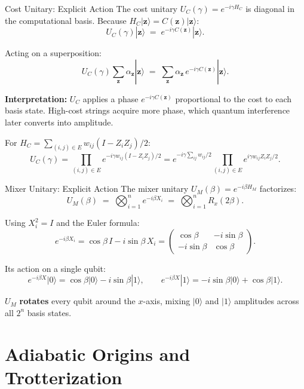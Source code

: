 \documentclass{beamer}
\begin{document}
\begin{frame}{Cost Unitary: Explicit Action}
The cost unitary $U_C(\gamma) = e^{-i\gamma H_C}$ is diagonal in the
computational basis. Because $H_C|\mathbf{z}\rangle = C(\mathbf{z})|\mathbf{z}\rangle$:
\[
U_C(\gamma)|\mathbf{z}\rangle
\;=\; e^{-i\gamma C(\mathbf{z})}|\mathbf{z}\rangle.
\]

Acting on a superposition:
\[
U_C(\gamma)\sum_{\mathbf{z}}\alpha_{\mathbf{z}}|\mathbf{z}\rangle
\;=\; \sum_{\mathbf{z}}\alpha_{\mathbf{z}}\,e^{-i\gamma C(\mathbf{z})}|\mathbf{z}\rangle.
\]

\textbf{Interpretation:} $U_C$ applies a phase $e^{-i\gamma C(\mathbf{z})}$
proportional to the cost to each basis state. High-cost strings
acquire more phase, which quantum interference later converts into
amplitude.

\medskip

For $H_C = \sum_{(i,j)\in E}w_{ij}(I-Z_iZ_j)/2$:
\[
U_C(\gamma) = \prod_{(i,j)\in E}
e^{-i\gamma w_{ij}(I-Z_iZ_j)/2}
= e^{-i\gamma \sum_{ij}w_{ij}/2}
\prod_{(i,j)\in E}e^{i\gamma w_{ij}Z_iZ_j/2}.
\]
\end{frame}


\begin{frame}{Mixer Unitary: Explicit Action}
The mixer unitary $U_M(\beta) = e^{-i\beta H_M}$ factorizes:
\[
U_M(\beta)
\;=\; \bigotimes_{i=1}^n e^{-i\beta X_i}
\;=\; \bigotimes_{i=1}^n R_x(2\beta).
\]

Using $X_i^2 = I$ and the Euler formula:
\[
e^{-i\beta X_i}
= \cos\beta\,I - i\sin\beta\,X_i
= \begin{pmatrix}\cos\beta & -i\sin\beta \\ -i\sin\beta & \cos\beta\end{pmatrix}.
\]

Its action on a single qubit:
\[
e^{-i\beta X}|0\rangle = \cos\beta|0\rangle - i\sin\beta|1\rangle,
\qquad
e^{-i\beta X}|1\rangle = -i\sin\beta|0\rangle + \cos\beta|1\rangle.
\]

$U_M$ \textbf{rotates} every qubit around the $x$-axis, mixing
$|0\rangle$ and $|1\rangle$ amplitudes across all $2^n$ basis states.
\end{frame}


\section{Adiabatic Origins and Trotterization}
\end{document}

